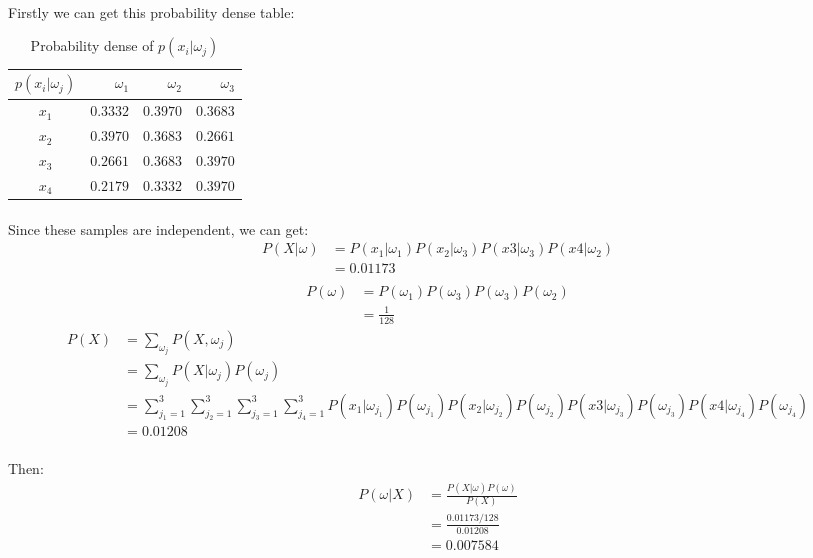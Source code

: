 \documentclass[]{article}
\begin{document}
            \paragraph{} Firstly we can get this probability dense table:
            \begin{table}[h!]
            \centering
            \caption{Probability dense of $p(x_i|\omega_j)$}
            \begin{tabular}{c|*{3}{r}}
                \hline
$p(x_i|\omega_j)$ & $\omega_1$ & $\omega_2$ & $\omega_3$ \\
\hline
$x_1$ & $0.3332$ & $0.3970$ & $0.3683$   \\
$x_2$ & $0.3970$ & $0.3683$ & $0.2661$   \\ 
$x_3$ & $0.2661$ & $0.3683$ & $0.3970$   \\
$x_4$ & $0.2179$ & $0.3332$ & $0.3970$   \\
                \hline
            \end{tabular}
            \end{table}
            \paragraph{} Since these samples are independent, we can get:
            \begin{align*}
P(X|\omega) 
&=P(x_1|\omega_1)P(x_2|\omega_3)P(x3|\omega_3)P(x4|\omega_2)\\
&= 0.01173 \\
            \end{align*}
            \begin{align*}
P(\omega) &=P(\omega_1)P(\omega_3)P(\omega_3)P(\omega_2)\\
&=\frac{1}{128}
            \end{align*}
            \begin{align*}
P(X) 
&= \sum_{\omega_j}P(X,\omega_j) \\
&= \sum_{\omega_j}P(X|\omega_j)P(\omega_j) \\
&= \sum_{j_1=1}^{3} \sum_{j_2=1}^{3}\sum_{j_3=1}^{3}\sum_{j_4=1}^{3} 
   P(x_1|\omega_{j_1})P(\omega_{j_1})P(x_2|\omega_{j_2})P(\omega_{j_2})P(x3|\omega_{j_3})P(\omega_{j_3})P(x4|\omega_{j_4})P(\omega_{j_4})\\
&=0.01208
            \end{align*}
            \paragraph{}Then:
            \begin{align*}
P(\omega|X) 
&=\frac{P(X|\omega)P(\omega)}{P(X)}\\
&=\frac{0.01173/128}{0.01208}\\
&=0.007584
            \end{align*}
\end{document}
